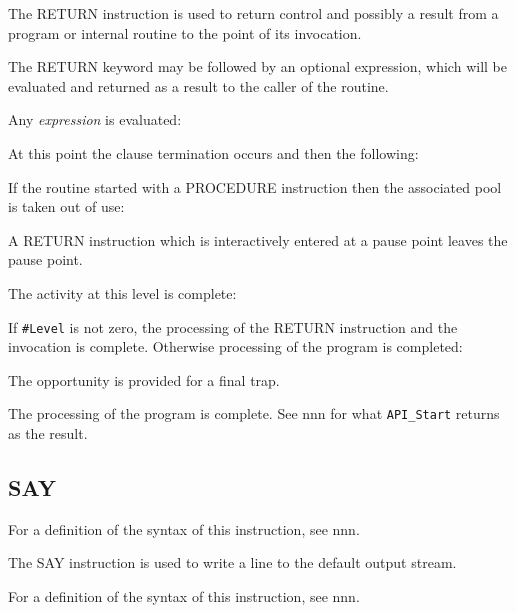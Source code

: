 The RETURN instruction is used to return control and possibly a result
from a program or internal routine to the point of its invocation.

The RETURN keyword may be followed by an optional expression, which will
be evaluated and returned as a result to the caller of the routine.

Any \emph{expression} is evaluated:



At this point the clause termination occurs and then the following:

If the routine started with a PROCEDURE instruction then the associated
pool is taken out of use:



A RETURN instruction which is interactively entered at a pause point
leaves the pause point.



The activity at this level is complete:



If \texttt{\#Level} is not zero, the processing of the RETURN
instruction and the invocation is complete. Otherwise processing of the
program is completed:

The opportunity is provided for a final trap.



The processing of the program is complete. See nnn for what
\texttt{API\_Start} returns as the result.

\subsection{SAY}\label{say}

For a definition of the syntax of this instruction, see nnn.

The SAY instruction is used to write a line to the default output
stream.



For a definition of the syntax of this instruction, see nnn.

